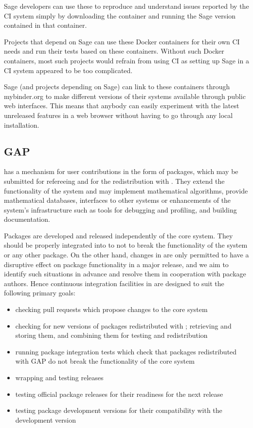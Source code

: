 \documentclass{deliverablereport}
\begin{document}
Sage developers can use these to reproduce and understand issues
reported by the CI system simply by downloading the container and running the
Sage version contained in that container.

Projects that depend on Sage can use these Docker containers for their own CI
needs and run their tests based on these containers. Without such Docker
containers, most such projects would refrain from using CI as setting up Sage
in a CI system appeared to be too complicated.

Sage (and projects depending on Sage) can link to these containers through
mybinder.org  to make
different versions of their systems available through public web interfaces.
This means that anybody can easily experiment with the latest unreleased
features in a web browser without having to go through any local installation.

\subsection{GAP}

\GAP has a mechanism for user contributions in the form of packages,
which may be submitted for refereeing and for the redistribution with \GAP.
They extend the functionality of the system and may implement mathematical
algorithms, provide mathematical databases, interfaces to other systems or
enhancements of the system's infrastructure such as tools for debugging
and profiling, and building documentation. 

Packages are developed and released independently of the core \GAP system.
They should be properly integrated into \GAP to not to break the functionality
of the system or any other package. On the other hand, changes in \GAP are only
permitted to have a disruptive effect on package functionality in a major
release, and we aim to identify such situations in advance and resolve them
in cooperation with package authors. Hence continuous integration facilities
in \GAP are designed to suit the following primary goals:
\begin{itemize}
\item checking pull requests which propose changes to the core \GAP system
\item checking for new versions of \GAP packages redistributed with \GAP;
retrieving and storing them, and combining them for testing and redistribution
\item running package integration tests which check that \GAP packages redistributed
with GAP do not break the functionality of the core \GAP system
\item wrapping and testing \GAP releases
\item testing official package releases for their readiness for the next \GAP release
\item testing package development versions for their compatibility with the \GAP development version
\end{itemize}
\end{document}
